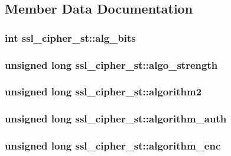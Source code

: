 \subsection{Member Data Documentation}
\hypertarget{structssl__cipher__st_a451f084cd7c875897f5986a35a482628}{
\subsubsection[{alg\-\_\-bits}]{\setlength{\rightskip}{0pt plus 5cm}int ssl\-\_\-cipher\-\_\-st\-::alg\-\_\-bits}}\label{structssl__cipher__st_a451f084cd7c875897f5986a35a482628}
\hypertarget{structssl__cipher__st_a7c6a3fecb3d246870ccb803260dc2b51}{
\subsubsection[{algo\-\_\-strength}]{\setlength{\rightskip}{0pt plus 5cm}unsigned long ssl\-\_\-cipher\-\_\-st\-::algo\-\_\-strength}}\label{structssl__cipher__st_a7c6a3fecb3d246870ccb803260dc2b51}
\hypertarget{structssl__cipher__st_aef80da6412c4e1fec8458c3c244d69e8}{
\subsubsection[{algorithm2}]{\setlength{\rightskip}{0pt plus 5cm}unsigned long ssl\-\_\-cipher\-\_\-st\-::algorithm2}}\label{structssl__cipher__st_aef80da6412c4e1fec8458c3c244d69e8}
\hypertarget{structssl__cipher__st_a43b013ec206a5c93d2de55b0e2848cf7}{
\subsubsection[{algorithm\-\_\-auth}]{\setlength{\rightskip}{0pt plus 5cm}unsigned long ssl\-\_\-cipher\-\_\-st\-::algorithm\-\_\-auth}}\label{structssl__cipher__st_a43b013ec206a5c93d2de55b0e2848cf7}
\hypertarget{structssl__cipher__st_a3c592f9eb460fc02b91ce59485324546}{
\subsubsection[{algorithm\-\_\-enc}]{\setlength{\rightskip}{0pt plus 5cm}unsigned long ssl\-\_\-cipher\-\_\-st\-::algorithm\-\_\-enc}}\label{structssl__cipher__st_a3c592f9eb460fc02b91ce59485324546}

